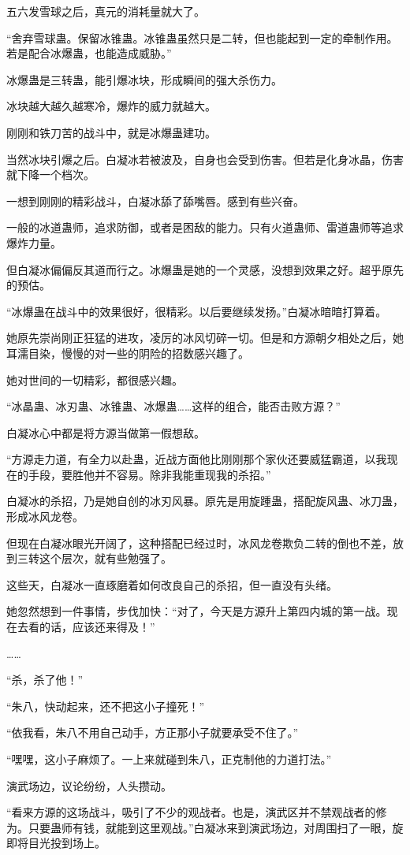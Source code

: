 \begin{this_body}
五六发雪球之后，真元的消耗量就大了。

“舍弃雪球蛊。保留冰锥蛊。冰锥蛊虽然只是二转，但也能起到一定的牵制作用。若是配合冰爆蛊，也能造成威胁。”

冰爆蛊是三转蛊，能引爆冰块，形成瞬间的强大杀伤力。

冰块越大越久越寒冷，爆炸的威力就越大。

刚刚和铁刀苦的战斗中，就是冰爆蛊建功。

当然冰块引爆之后。白凝冰若被波及，自身也会受到伤害。但若是化身冰晶，伤害就下降一个档次。

一想到刚刚的精彩战斗，白凝冰舔了舔嘴唇。感到有些兴奋。

一般的冰道蛊师，追求防御，或者是困敌的能力。只有火道蛊师、雷道蛊师等追求爆炸力量。

但白凝冰偏偏反其道而行之。冰爆蛊是她的一个灵感，没想到效果之好。超乎原先的预估。

“冰爆蛊在战斗中的效果很好，很精彩。以后要继续发扬。”白凝冰暗暗打算着。

她原先崇尚刚正狂猛的进攻，凌厉的冰风切碎一切。但是和方源朝夕相处之后，她耳濡目染，慢慢的对一些的阴险的招数感兴趣了。

她对世间的一切精彩，都很感兴趣。

“冰晶蛊、冰刃蛊、冰锥蛊、冰爆蛊……这样的组合，能否击败方源？”

白凝冰心中都是将方源当做第一假想敌。

“方源走力道，有全力以赴蛊，近战方面他比刚刚那个家伙还要威猛霸道，以我现在的手段，要胜他并不容易。除非我能重现我的杀招。”

白凝冰的杀招，乃是她自创的冰刃风暴。原先是用旋踵蛊，搭配旋风蛊、冰刀蛊，形成冰风龙卷。

但现在白凝冰眼光开阔了，这种搭配已经过时，冰风龙卷欺负二转的倒也不差，放到三转这个层次，就有些勉强了。

这些天，白凝冰一直琢磨着如何改良自己的杀招，但一直没有头绪。

她忽然想到一件事情，步伐加快：“对了，今天是方源升上第四内城的第一战。现在去看的话，应该还来得及！”

……

“杀，杀了他！”

“朱八，快动起来，还不把这小子撞死！”

“依我看，朱八不用自己动手，方正那小子就要承受不住了。”

“嘿嘿，这小子麻烦了。一上来就碰到朱八，正克制他的力道打法。”

演武场边，议论纷纷，人头攒动。

“看来方源的这场战斗，吸引了不少的观战者。也是，演武区并不禁观战者的修为。只要蛊师有钱，就能到这里观战。”白凝冰来到演武场边，对周围扫了一眼，旋即将目光投到场上。


\end{this_body}
